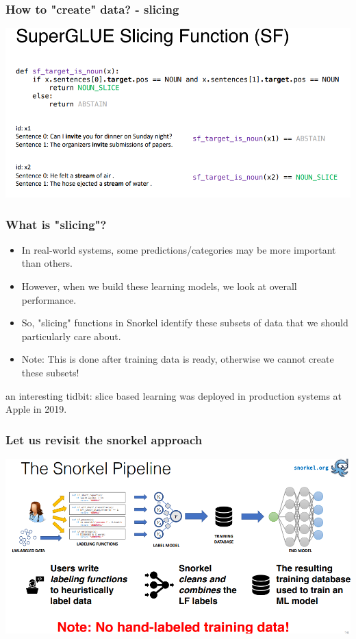 \documentclass{beamer}
\begin{document}
\begin{frame}
\frametitle{How to "create" data? - slicing}
    \includegraphics[width=\textwidth]{figures/slicingexample.PNG}
\end{frame}

\begin{frame}
\frametitle{What is "slicing"?}
\begin{itemize}
    \item In real-world systems, some predictions/categories may be more important than others.
    \item However, when we build these learning models, we look at overall performance.
    \item So, "slicing" functions in Snorkel identify these subsets of data that we should particularly care about. 
    \item Note: This is done after training data is ready, otherwise we cannot create these subsets!
\end{itemize}
an interesting tidbit: slice based learning was deployed in production systems at Apple in 2019. 
\end{frame}

\begin{frame}
\frametitle{Let us revisit the snorkel approach}
    \includegraphics[width=\textwidth]{figures/snorkelradiologyexample.PNG}
\end{frame}
\end{document}
